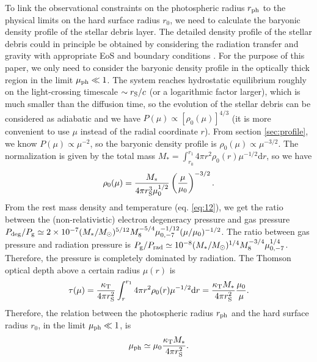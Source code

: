 \documentclass[useAMS,usenatbib]{mn2e}
\def\d{{\mathrm{d}}}
\begin{document}
To link the observational constraints on the photospheric radius
$r_{\rm ph}$  to the physical limits on the hard surface radius
$r_0$, we need to calculate the baryonic density profile of the
stellar debris layer. The detailed density profile of the 
stellar debris could in principle be obtained by considering the radiation
transfer and gravity with appropriate EoS and boundary conditions
\citep[e.g.][]{1986ApJ...302....1P, 2016MNRAS.458.3420W}. For the
purpose of this paper, we only need to consider the baryonic 
density profile in the optically thick region in the limit
$\mu_{\rm ph}\ll1$. The system reaches hydrostatic equilibrium roughly
on the light-crossing timescale $\sim r_{\rm S}/c$ (or a logarithmic
factor larger), which is much smaller than the diffusion time, so the
evolution of the stellar debris can be considered as adiabatic and we
have $P(\mu)\propto [\rho_0(\mu)]^{4/3}$ (it is more convenient  
to use $\mu$ instead of the radial coordinate $r$). From section
\ref{sec:profile}, we know $P(\mu)\propto \mu^{-2}$, so the baryonic
density profile is $\rho_0(\mu) \propto \mu^{-3/2}$. The normalization
is given by the total mass $M_* = \int_{r_0}^{r_1}
4\pi r^2 \rho_0(r) \mu^{-1/2}\d r$, so we have 
\begin{equation}
  \label{eq:10}
  \rho_0(\mu) = \frac{M_*}{4\pi r_{\rm S}^3 \mu_0^{1/2}}
  \left( \frac{\mu}{\mu_0} \right)^{-3/2}. 
\end{equation}
From the rest mass density and temperature (eq. \ref{eq:12}), we get
the ratio between the (non-relativistic) electron degeneracy pressure
and gas pressure $P_{\rm deg}/P_{\rm g}\simeq 2\times10^{-7} 
  (M_*/M_{\rm \odot})^{5/12} M_8^{-5/4} \mu_{0,-7}^{-1/12}
  (\mu/\mu_0)^{-1/2}$. The ratio between gas pressure and
  radiation pressure is $P_{\rm g}/P_{\rm rad}\simeq 10^{-8} 
 (M_*/M_{\rm \odot})^{1/4} M_8^{-3/4} \mu_{0,-7}^{1/4}$. Therefore,
 the pressure is completely dominated by radiation.
The Thomson optical depth above a certain radius $\mu(r)$ is
\begin{equation}
  \label{eq:11}
      \tau(\mu) = \frac{\kappa_{\rm T}}{4\pi r_{\rm S}^2} \int_r^{r_1} 4\pi
  r^2 \rho_0(r) \mu^{-1/2} \d r =\frac{\kappa_{\rm T}M_*}{4\pi r_{\rm S}^2}
  \frac{\mu_0}{\mu}.
\end{equation}
Therefore, the relation between the photospheric radius $r_{\rm ph}$
and the hard surface radius $r_0$, in the
limit $\mu_{\rm  ph}\ll 1$, is 
\begin{equation}
\label{eq:muph}
\mu_{\rm ph}\simeq \mu_0
\frac{\kappa_{\rm T}M_*}{4\pi r_{\rm S}^2}.
\end{equation}
\end{document}
